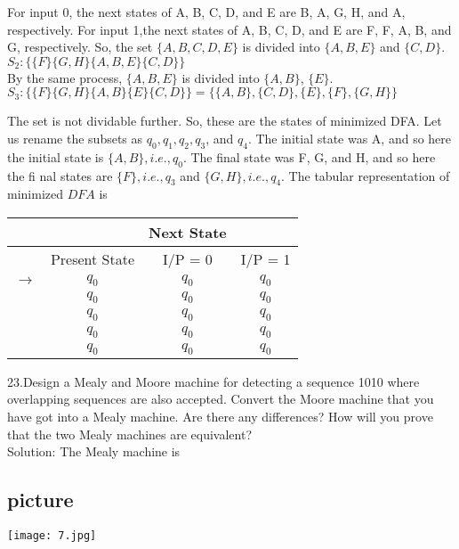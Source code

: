 \documentclass[9pt]{beamer}
\begin{document}
\begin{frame}
For input 0, the next states of A, B, C, D, and E are B, A, G, H, and A, respectively. For input 1,the next states of A, B, C, D, and E are F, F, A, B, and G, respectively. So, the set $\{A, B, C, D, E\}$ is divided into $\{A, B, E\}$ and $\{C, D\}$.\\
             $S_2: \{\{F\} \{G, H\} \{A, B, E\} \{C, D\}\}$\\
By the same process, $\{A, B, E\}$ is divided into $\{A, B\}$, $\{E\}$.\\
$S_3: \{\{F\} \{G, H\} \{A, B\} \{E\} \{C, D\}\} = \{\{A, B\}, \{C, D\}, \{E\}, \{F\}, \{G, H\}\}$\\
\end{frame}

\begin{frame}
The set is not dividable further. So, these are the states of minimized DFA. Let us rename the subsets as $q_0, q_1, q_2, q_3$, and $q_4$. The initial state was A, and so here the initial state is $\{A, B\}, i.e., q_0$. The ﬁnal state was F, G, and H, and so here the ﬁ nal states are $\{F\}, i.e., q_3$ and $\{G, H\}, i.e., q_4$. The tabular representation of minimized $DFA$ is
\\

\begin{center}

	\begin{tabular}{rccc}
		\hline
		&&Next State\\
		\hline
		&Present State&I/P = 0&I/P = 1\\
		\hline
		$\rightarrow$&$q_{0}$&$q_{0}$&$q_{0}$\\
		&$q_{0}$&$q_{0}$&$q_{0}$\\
		&$q_{0}$&$q_{0}$&$q_{0}$\\
		&$q_{0}$&$q_{0}$&$q_{0}$\\
		&$q_{0}$&$q_{0}$&$q_{0}$\\
		\hline
	\end{tabular}
\end{center}
\end{frame}

\begin{frame}
23.Design a Mealy and Moore machine for detecting a sequence 1010 where overlapping sequences are also accepted. Convert the Moore machine that you have got into a Mealy machine. Are there any differences? How will you prove that the two Mealy machines are equivalent?\\
Solution: The Mealy machine is\\

\begin{center}
\section{picture}
\texttt{[image: 7.jpg]}
\end{center}

\end{frame}
\end{document}
